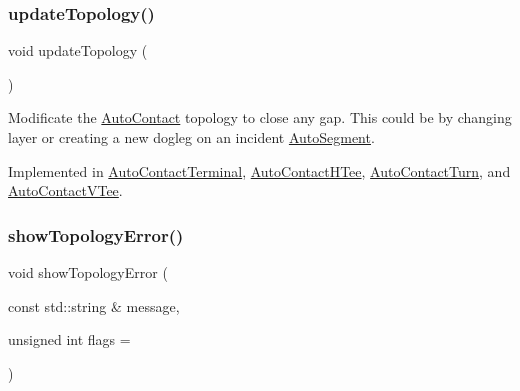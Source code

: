 \mbox{\label{classKatabatic_1_1AutoContact_a690764ddc997fe9766a79c4b8e0c3e2f}} 
\subsubsection{\texorpdfstring{update\+Topology()}{updateTopology()}}
{\footnotesize\ttfamily void update\+Topology (\begin{DoxyParamCaption}{ }\end{DoxyParamCaption})\hspace{0.3cm}{\ttfamily [pure virtual]}}

Modificate the \hyperlink{classKatabatic_1_1AutoContact}{Auto\+Contact} topology to close any gap. This could be by changing layer or creating a new dogleg on an incident \hyperlink{classKatabatic_1_1AutoSegment}{Auto\+Segment}. 

Implemented in \hyperlink{classKatabatic_1_1AutoContactTerminal_af5bf1f5e71204ef84346e4e036175431}{Auto\+Contact\+Terminal}, \hyperlink{classKatabatic_1_1AutoContactHTee_af5bf1f5e71204ef84346e4e036175431}{Auto\+Contact\+H\+Tee}, \hyperlink{classKatabatic_1_1AutoContactTurn_af5bf1f5e71204ef84346e4e036175431}{Auto\+Contact\+Turn}, and \hyperlink{classKatabatic_1_1AutoContactVTee_af5bf1f5e71204ef84346e4e036175431}{Auto\+Contact\+V\+Tee}.

\mbox{\label{classKatabatic_1_1AutoContact_a66f92d8233776fb858075f78af451997}} 
\subsubsection{\texorpdfstring{show\+Topology\+Error()}{showTopologyError()}}
{\footnotesize\ttfamily void show\+Topology\+Error (\begin{DoxyParamCaption}\item[{const std\+::string \&}]{message,  }\item[{unsigned int}]{flags = {} }\end{DoxyParamCaption})}

